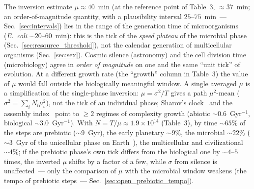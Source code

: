 \documentclass[11pt,a4paper]{article}
\begin{document}
The inversion estimate $\mu \approx 40$~min (at the reference point of Table~3, $\approx 37$~min; an order-of-magnitude quantity, with a plausibility interval $25$--$75$~min~--- Sec.~\ref{sec:intervals}) lies in the range of the generation time of microorganisms (\emph{E.~coli} $\sim 20$--$60$~min): this is the tick of the \emph{speed plateau} of the microbial phase (Sec.~\ref{sec:resource_threshold}), not the calendar generation of multicellular organisms (Sec.~\ref{sec:sex}). Cosmic silence (astronomy) and the cell division time (microbiology) agree in \emph{order of magnitude} on one and the same ``unit tick'' of evolution. At a different growth rate (the ``growth'' column in Table~3) the value of $\mu$ would fall outside the biologically meaningful window. A single averaged $\mu$ is a simplification of the single-phase inversion: $\mu=\sigma^2/T$ gives a path $\mu^2$-mean ($\sigma^2=\sum_i N_i\mu_i^2$), not the tick of an individual phase; Sharov's clock~\cite{Sharov2013} and the assembly index~\cite{Marshall2021,Cronin2023} point to $\geq 2$ regimes of complexity growth (abiotic $\sim 0.6$~Gyr$^{-1}$, biological $\sim 3.0$~Gyr$^{-1}$). With $N = T/\mu \approx 1.9\times10^{14}$ (Table~3), by time $\sim 65\%$ of the steps are prebiotic ($\sim 9$~Gyr), the early planetary $\sim 9\%$, the microbial $\sim 22\%$ ($\sim 3$~Gyr of the unicellular phase on Earth~\cite{Nutman2016}), the multicellular and civilizational $\sim 4\%$; if the prebiotic phase's own tick differs from the biological one by $\sim 4$--$5$ times, the inverted $\mu$ shifts by a factor of a few, while $\sigma$ from silence is unaffected~--- only the comparison of $\mu$ with the microbial window weakens (the tempo of prebiotic steps~--- Sec.~\ref{sec:open_prebiotic_tempo}).
\end{document}

